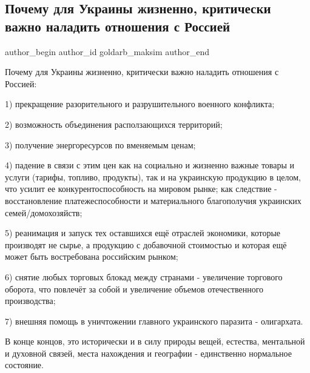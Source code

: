  
 
 
 
 
 
\subsection{Почему для Украины жизненно, критически важно наладить отношения с Россией}
\label{sec:13_10_2021.fb.goldarb_maksim.1.ukraina_rossia}
 
\ifcmt
 author_begin
   author_id goldarb_maksim
 author_end
\fi

Почему для Украины жизненно, критически важно наладить отношения с Россией:

1) прекращение разорительного и разрушительного военного конфликта;

2) возможность объединения расползающихся территорий;

3) получение энергоресурсов по вменяемым ценам;

4) падение в связи с этим цен как на социально и жизненно важные товары и
услуги (тарифы, топливо, продукты), так и на украинскую продукцию в целом, что
усилит ее конкурентоспособность на мировом рынке; как следствие -
восстановление платежеспособности и материального благополучия украинских
семей/домохозяйств; 

5) реанимация и запуск тех оставшихся ещё отраслей экономики, которые
производят не сырье, а продукцию с добавочной стоимостью и которая ещё может
быть востребована российским рынком; 

6) снятие любых торговых блокад между странами - увеличение торгового оборота,
что повлечёт за собой и увеличение объемов отечественного производства; 

7) внешняя помощь в уничтожении главного украинского паразита - олигархата. 

В конце концов, это исторически и в силу природы вещей, естества, ментальной и
духовной связей, места нахождения и географии - единственно нормальное
состояние. 

